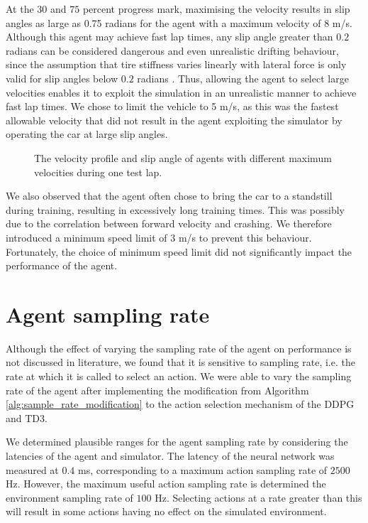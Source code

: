 At the $30$ and $75$ percent progress mark, maximising the velocity results in slip angles as large as 0.75 radians for the agent with a maximum velocity of 8 m/s.
Although this agent may achieve fast lap times, any slip angle greater than $0.2$ radians can be considered dangerous and even unrealistic drifting behaviour, since the assumption that tire stiffness varies linearly with lateral force is only valid for slip angles below $0.2$ radians \cite{Vorotovic2013}.
Thus, allowing the agent to select large velocities enables it to exploit the simulation in an unrealistic manner to achieve fast lap times.
We chose to limit the vehicle to 5 m/s, as this was the fastest allowable velocity that did not result in the agent exploiting the simulator by operating the car at large slip angles.

\begin{figure}[htb!]
    \centering
    
    \caption{The velocity profile and slip angle of agents with different maximum velocities during one test lap.}
    \label{fig:vel_profile}
\end{figure}

We also observed that the agent often chose to bring the car to a standstill during training, resulting in excessively long training times.
This was possibly due to the correlation between forward velocity and crashing. 
We therefore introduced a minimum speed limit of $3$ m/s to prevent this behaviour.
Fortunately, the choice of minimum speed limit did not  significantly impact the performance of the agent.


\section{Agent sampling rate} 
Although the effect of varying the sampling rate of the agent on performance is not discussed in literature, we found that it is sensitive to sampling rate, i.e. the rate at which it is called to select an action. 
We were able to vary the sampling rate of the agent after implementing the modification from Algorithm \ref{alg:sample_rate_modification} to the action selection mechanism of the DDPG and TD3.

We determined plausible ranges for the agent sampling rate by considering the latencies of the agent and simulator.
The latency of the neural network was measured at $0.4$ ms, corresponding to a maximum action sampling rate of $2500$ Hz.
However, the maximum useful action sampling rate is determined the environment sampling rate of $100$ Hz.
Selecting actions at a rate greater than this will result in some actions having no effect on the simulated environment.

